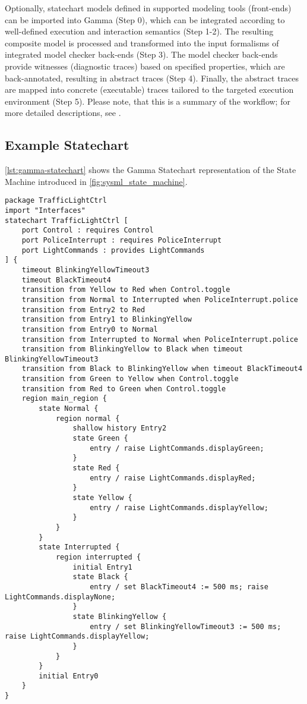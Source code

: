 Optionally, statechart models defined in supported modeling tools (front-ends) can be imported into Gamma (Step 0), which can be integrated according to well-defined execution and interaction semantics (Step 1-2). The resulting composite model is processed and transformed into the input formalisms of integrated model checker back-ends (Step 3). The model checker back-ends provide witnesses (diagnostic traces) based on specified properties, which are back-annotated, resulting in abstract traces (Step 4).
Finally, the abstract traces are mapped into concrete (executable) traces tailored to the targeted execution environment (Step 5). Please note, that this is a summary of the workflow; for more detailed descriptions, see \cite{mixed_statecharts_2020}.

\subsection{Example Statechart}

\autoref{lst:gamma-statechart} shows the Gamma Statechart representation of the State Machine introduced in \autoref{fig:sysml_state_machine}. 

\begin{lstlisting}[float,language=statechart, caption={The traffic light controller state machine in the Gamma textual representation.}, label={lst:gamma-statechart}]
package TrafficLightCtrl
import "Interfaces"
statechart TrafficLightCtrl [
	port Control : requires Control
	port PoliceInterrupt : requires PoliceInterrupt
	port LightCommands : provides LightCommands
] {
	timeout BlinkingYellowTimeout3
	timeout BlackTimeout4
	transition from Yellow to Red when Control.toggle
	transition from Normal to Interrupted when PoliceInterrupt.police
	transition from Entry2 to Red
	transition from Entry1 to BlinkingYellow
	transition from Entry0 to Normal
	transition from Interrupted to Normal when PoliceInterrupt.police
	transition from BlinkingYellow to Black when timeout BlinkingYellowTimeout3
	transition from Black to BlinkingYellow when timeout BlackTimeout4
	transition from Green to Yellow when Control.toggle
	transition from Red to Green when Control.toggle
	region main_region {
		state Normal {
			region normal {
				shallow history Entry2
				state Green {
					entry / raise LightCommands.displayGreen;
				}
				state Red {
					entry / raise LightCommands.displayRed;
				}
				state Yellow {
					entry / raise LightCommands.displayYellow;
				}
			}
		}
		state Interrupted {
			region interrupted {
				initial Entry1
				state Black {
					entry / set BlackTimeout4 := 500 ms; raise LightCommands.displayNone;
				}
				state BlinkingYellow {
					entry / set BlinkingYellowTimeout3 := 500 ms; raise LightCommands.displayYellow;
				}
			}
		}
		initial Entry0
	}
}
\end{lstlisting}